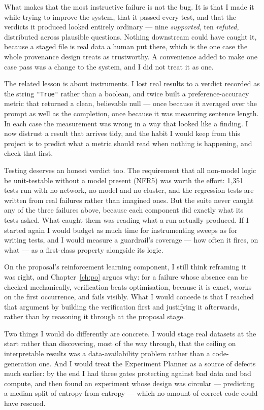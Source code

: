 What makes that the most instructive failure is not the bug. It is that I made it
while trying to improve the system, that it passed every test, and that the
verdicts it produced looked entirely ordinary --- nine \emph{supported}, ten
\emph{refuted}, distributed across plausible questions. Nothing downstream could
have caught it, because a staged file is real data a human put there, which is the
one case the whole provenance design treats as trustworthy. A convenience added to
make one case pass was a change to the system, and I did not treat it as one.

The related lesson is about instruments. I lost real results to a verdict recorded
as the string \texttt{"True"} rather than a boolean, and twice built a
preference-accuracy metric that returned a clean, believable null --- once because
it averaged over the prompt as well as the completion, once because it was
measuring sentence length. In each case the measurement was wrong in a way that
looked like a finding. I now distrust a result that arrives tidy, and the habit I
would keep from this project is to predict what a metric should read when nothing
is happening, and check that first.

Testing deserves an honest verdict too. The requirement that all non-model logic be
unit-testable without a model present (NFR5) was worth the effort: 1{,}351 tests
run with no network, no model and no cluster, and the regression tests are written
from real failures rather than imagined ones. But the suite never caught any of the
three failures above, because each component did exactly what its tests asked. What
caught them was reading what a run actually produced. If I started again I would
budget as much time for instrumenting sweeps as for writing tests, and I would
measure a guardrail's coverage --- how often it fires, on what --- as a first-class
property alongside its logic.

On the proposal's reinforcement learning component, I still think reframing it was
right, and Chapter~\ref{ch:po} argues why: for a failure whose absence can be
checked mechanically, verification beats optimisation, because it is exact, works
on the first occurrence, and fails visibly. What I would concede is that I reached
that argument by building the verification first and justifying it afterwards,
rather than by reasoning it through at the proposal stage.

Two things I would do differently are concrete. I would stage real datasets at the
start rather than discovering, most of the way through, that the ceiling on
interpretable results was a data-availability problem rather than a code-generation
one. And I would treat the Experiment Planner as a source of defects much earlier:
by the end I had three gates protecting against bad data and bad compute, and then
found an experiment whose design was circular --- predicting a median split of
entropy from entropy --- which no amount of correct code could have rescued.


